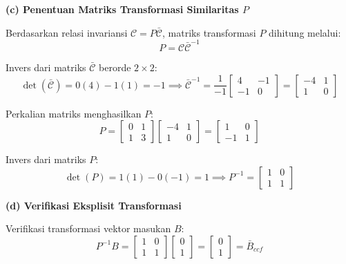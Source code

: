 \documentclass[11pt,a4paper]{article}
\begin{document}
\textbf{(c) Penentuan Matriks Transformasi Similaritas $P$}

Berdasarkan relasi invariansi $\mathcal{C} = P \bar{\mathcal{C}}$, matriks transformasi $P$ dihitung melalui:
$$P = \mathcal{C} \bar{\mathcal{C}}^{-1}$$

Invers dari matriks $\bar{\mathcal{C}}$ berorde $2 \times 2$:
$$\det(\bar{\mathcal{C}}) = 0(4) - 1(1) = -1 \implies \bar{\mathcal{C}}^{-1} = \frac{1}{-1} \begin{bmatrix} 4 & -1 \\ -1 & 0 \end{bmatrix} = \begin{bmatrix} -4 & 1 \\ 1 & 0 \end{bmatrix}$$

Perkalian matriks menghasilkan $P$:
$$P = \begin{bmatrix} 0 & 1 \\ 1 & 3 \end{bmatrix} \begin{bmatrix} -4 & 1 \\ 1 & 0 \end{bmatrix} = \begin{bmatrix} 1 & 0 \\ -1 & 1 \end{bmatrix}$$

Invers dari matriks $P$:
$$\det(P) = 1(1) - 0(-1) = 1 \implies P^{-1} = \begin{bmatrix} 1 & 0 \\ 1 & 1 \end{bmatrix}$$

\textbf{(d) Verifikasi Eksplisit Transformasi}

Verifikasi transformasi vektor masukan $B$:
$$P^{-1} B = \begin{bmatrix} 1 & 0 \\ 1 & 1 \end{bmatrix} \begin{bmatrix} 0 \\ 1 \end{bmatrix} = \begin{bmatrix} 0 \\ 1 \end{bmatrix} = \bar{B}_{ccf}$$
\end{document}
